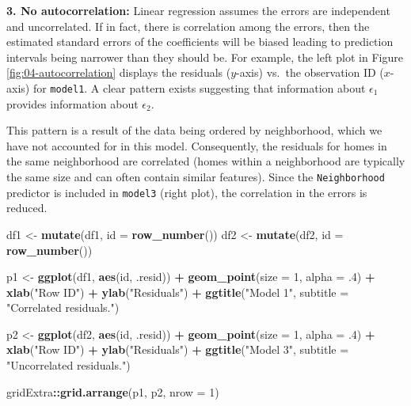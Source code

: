 \documentclass[]{krantz}
\makeatletter
\newenvironment{Shaded}{\begin{snugshade}}{\end{snugshade}}
\newcommand{\DataTypeTok}[1]{\textcolor[rgb]{0.27,0.27,0.27}{#1}}
\newcommand{\DecValTok}[1]{\textcolor[rgb]{0.06,0.06,0.06}{#1}}
\newcommand{\FloatTok}[1]{\textcolor[rgb]{0.06,0.06,0.06}{#1}}
\newcommand{\KeywordTok}[1]{\textcolor[rgb]{0.27,0.27,0.27}{\textbf{#1}}}
\newcommand{\NormalTok}[1]{#1}
\newcommand{\OperatorTok}[1]{\textcolor[rgb]{0.43,0.43,0.43}{\textbf{#1}}}
\newcommand{\StringTok}[1]{\textcolor[rgb]{0.5,0.5,0.5}{#1}}
\newenvironment{kframe}{%
\medskip{}
\setlength{\fboxsep}{.8em}
 \def\at@end@of@kframe{}%
 \ifinner\ifhmode%
  \def\at@end@of@kframe{\end{minipage}}%
  \begin{minipage}{\columnwidth}%
 \fi\fi%
 \def\FrameCommand##1{\hskip\@totalleftmargin \hskip-\fboxsep
 \colorbox{shadecolor}{##1}\hskip-\fboxsep
     \hskip-\linewidth \hskip-\@totalleftmargin \hskip\columnwidth}%
 \MakeFramed {\advance\hsize-\width
   \@totalleftmargin\z@ \linewidth\hsize
   \@setminipage}}%
 {\par\unskip\endMakeFramed%
 \at@end@of@kframe}
\renewenvironment{Shaded}{\begin{kframe}}{\end{kframe}}
\makeatother
\begin{document}
\textbf{3. No autocorrelation:} Linear regression assumes the errors are independent and uncorrelated. If in fact, there is correlation among the errors, then the estimated standard errors of the coefficients will be biased leading to prediction intervals being narrower than they should be. For example, the left plot in Figure \ref{fig:04-autocorrelation} displays the residuals (\(y\)-axis) vs.~the observation ID (\(x\)-axis) for \texttt{model1}. A clear pattern exists suggesting that information about \(\epsilon_1\) provides information about \(\epsilon_2\).

This pattern is a result of the data being ordered by neighborhood, which we have not accounted for in this model. Consequently, the residuals for homes in the same neighborhood are correlated (homes within a neighborhood are typically the same size and can often contain similar features). Since the \texttt{Neighborhood} predictor is included in \texttt{model3} (right plot), the correlation in the errors is reduced.

\begin{Shaded}
\begin{Highlighting}[]

\NormalTok{df1 <-}\StringTok{ }\KeywordTok{mutate}\NormalTok{(df1, }\DataTypeTok{id =} \KeywordTok{row_number}\NormalTok{())}
\NormalTok{df2 <-}\StringTok{ }\KeywordTok{mutate}\NormalTok{(df2, }\DataTypeTok{id =} \KeywordTok{row_number}\NormalTok{())}

\NormalTok{p1 <-}\StringTok{ }\KeywordTok{ggplot}\NormalTok{(df1, }\KeywordTok{aes}\NormalTok{(id, .resid)) }\OperatorTok{+}\StringTok{ }
\StringTok{  }\KeywordTok{geom_point}\NormalTok{(}\DataTypeTok{size =} \DecValTok{1}\NormalTok{, }\DataTypeTok{alpha =} \FloatTok{.4}\NormalTok{) }\OperatorTok{+}
\StringTok{  }\KeywordTok{xlab}\NormalTok{(}\StringTok{"Row ID"}\NormalTok{) }\OperatorTok{+}
\StringTok{  }\KeywordTok{ylab}\NormalTok{(}\StringTok{"Residuals"}\NormalTok{) }\OperatorTok{+}
\StringTok{  }\KeywordTok{ggtitle}\NormalTok{(}\StringTok{"Model 1"}\NormalTok{,}
    \DataTypeTok{subtitle =} \StringTok{"Correlated residuals."}\NormalTok{)}

\NormalTok{p2 <-}\StringTok{ }\KeywordTok{ggplot}\NormalTok{(df2, }\KeywordTok{aes}\NormalTok{(id, .resid)) }\OperatorTok{+}\StringTok{ }
\StringTok{  }\KeywordTok{geom_point}\NormalTok{(}\DataTypeTok{size =} \DecValTok{1}\NormalTok{, }\DataTypeTok{alpha =} \FloatTok{.4}\NormalTok{) }\OperatorTok{+}
\StringTok{  }\KeywordTok{xlab}\NormalTok{(}\StringTok{"Row ID"}\NormalTok{) }\OperatorTok{+}
\StringTok{  }\KeywordTok{ylab}\NormalTok{(}\StringTok{"Residuals"}\NormalTok{) }\OperatorTok{+}
\StringTok{  }\KeywordTok{ggtitle}\NormalTok{(}\StringTok{"Model 3"}\NormalTok{,}
    \DataTypeTok{subtitle =} \StringTok{"Uncorrelated residuals."}\NormalTok{)}

\NormalTok{gridExtra}\OperatorTok{::}\KeywordTok{grid.arrange}\NormalTok{(p1, p2, }\DataTypeTok{nrow =} \DecValTok{1}\NormalTok{)}
\end{Highlighting}
\end{Shaded}
\end{document}
